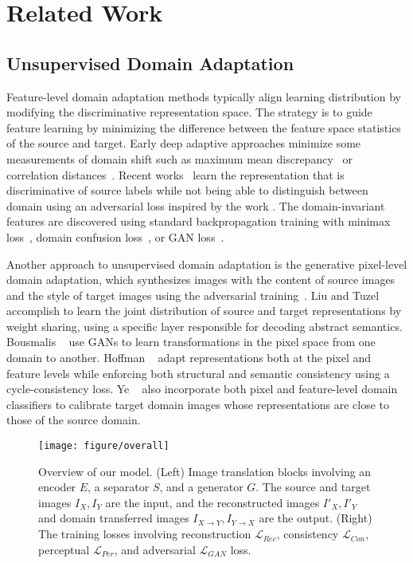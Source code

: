 \documentclass[final]{cvpr}
\begin{document}
     



\section{Related Work}
\label{sec:related}

\subsection{Unsupervised Domain Adaptation}
Feature-level domain adaptation methods typically align learning distribution by modifying the discriminative representation space.
The strategy is to guide feature learning by minimizing the difference between the feature space statistics of the source and target.
Early deep adaptive approaches minimize some measurements of domain shift such as maximum mean discrepancy~\cite{tzeng2014deep,long2015learning} or correlation distances~\cite{sun2016deep}. 
Recent works~\cite{ganin2016domain,tzeng2015simultaneous,tzeng2017adversarial} learn the representation that is discriminative of source labels while not being able to distinguish between domain using an adversarial loss inspired by the work \cite{ben2006analysis}.
The domain-invariant features are discovered using standard backpropagation training with minimax loss~\cite{ganin2016domain}, domain confusion loss~\cite{tzeng2015simultaneous}, or GAN loss~\cite{tzeng2017adversarial}.

Another approach to unsupervised domain adaptation is the generative pixel-level domain adaptation, which synthesizes images with the content of source images and the style of target images using the adversarial training~\cite{goodfellow2014generative}.
Liu and Tuzel~\cite{liu2016coupled} accomplish to learn the joint distribution of source and target representations by weight sharing, using a specific layer responsible for decoding abstract semantics.
Bousmalis \etal~\cite{bousmalis2017unsupervised} use GANs to learn transformations in the pixel space from one domain to another. 
Hoffman \etal~\cite{hoffman2018cycada} adapt representations both at the pixel and feature levels while enforcing both structural and semantic consistency using a cycle-consistency loss.
Ye \etal~\cite{ye2020light} also incorporate both pixel and feature-level domain classifiers to calibrate target domain images whose representations are close to those of the source domain.


\begin{figure*}[t] 
	\centering
    \texttt{[image: figure/overall]}
	\caption{Overview of our model. (Left) Image translation blocks involving an encoder $E$, a separator $S$, and a generator $G$. The source and target images $I_X, I_Y$ are the input, and the reconstructed images $I'_X, I'_Y$ and domain transferred images $I_{X\to Y}, I_{Y\to X}$ are the output. (Right) The training losses involving reconstruction $\mathcal{L}_{Rec}$, consistency $\mathcal{L}_{Con}$, perceptual $\mathcal{L}_{Per}$, and adversarial $\mathcal{L}_{GAN}$ loss.}
	\label{fig:overview}
	\vspace{-3mm}
\end{figure*}
\end{document}
